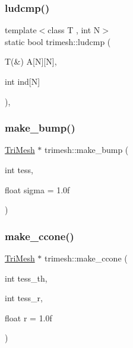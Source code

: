 \subsubsection{\texorpdfstring{ludcmp()}{ludcmp()}}
{\footnotesize\ttfamily template$<$class T , int N$>$ \\
static bool trimesh\+::ludcmp (\begin{DoxyParamCaption}\item[{T(\&)}]{A\mbox{[}\+N\mbox{]}\mbox{[}\+N\mbox{]},  }\item[{int}]{ind\mbox{[}\+N\mbox{]} }\end{DoxyParamCaption})\hspace{0.3cm}{\ttfamily [inline]}, {\ttfamily [static]}}

\mbox{\label{namespacetrimesh_a7b8d1ea4466f1e4fa15da392cfb53c7c}} 
\subsubsection{\texorpdfstring{make\+\_\+bump()}{make\_bump()}}
{\footnotesize\ttfamily \hyperlink{classtrimesh_1_1TriMesh}{Tri\+Mesh} $\ast$ trimesh\+::make\+\_\+bump (\begin{DoxyParamCaption}\item[{int}]{tess,  }\item[{float}]{sigma = {\ttfamily 1.0f} }\end{DoxyParamCaption})}

\mbox{\label{namespacetrimesh_a77082e081b367be3a5f74e20934c78b2}} 
\subsubsection{\texorpdfstring{make\+\_\+ccone()}{make\_ccone()}}
{\footnotesize\ttfamily \hyperlink{classtrimesh_1_1TriMesh}{Tri\+Mesh} $\ast$ trimesh\+::make\+\_\+ccone (\begin{DoxyParamCaption}\item[{int}]{tess\+\_\+th,  }\item[{int}]{tess\+\_\+r,  }\item[{float}]{r = {\ttfamily 1.0f} }\end{DoxyParamCaption})}

